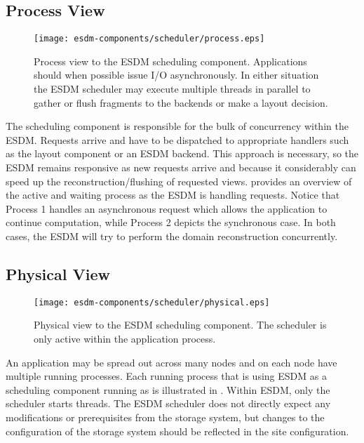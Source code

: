 \subsection{Process View}

\begin{figure}
	\centering
	\texttt{[image: esdm-components/scheduler/process.eps]}
	\caption{Process view to the ESDM scheduling component. Applications should when possible issue I/O asynchronously. In either situation the ESDM scheduler may execute multiple threads in parallel to gather or flush fragments to the backends or make a layout decision.}
	\label{fig:esdm scheduler process view}
\end{figure}

The scheduling component is responsible for the bulk of concurrency within the ESDM.
Requests arrive and have to be dispatched to appropriate handlers such as the layout component or an ESDM backend.
This approach is necessary, so the ESDM remains responsive as new requests arrive and because it considerably can speed up the reconstruction/flushing of requested views.
 provides an overview of the active and waiting process as the ESDM is handling requests. Notice that Process 1 handles an asynchronous request which allows the application to continue computation, while Process 2 depicts the synchronous case.
In both cases, the ESDM will try to perform the domain reconstruction concurrently.


\subsection{Physical View}

\begin{figure}
	\centering
	\texttt{[image: esdm-components/scheduler/physical.eps]}
	\caption{Physical view to the ESDM scheduling component. The scheduler is only active within the application process.}
	\label{fig:esdm scheduler physical view}
\end{figure}


An application may be spread out across many nodes and on each node have multiple running processes.
Each running process that is using ESDM as a scheduling component running as is illustrated in .
Within ESDM, only the scheduler starts threads.
The ESDM scheduler does not directly expect any modifications or prerequisites from the storage system, but changes to the configuration of the storage system should be reflected in the site configuration.

%
%
%
%
%
